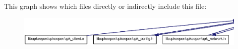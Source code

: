 This graph shows which files directly or indirectly include this file:\nopagebreak
\begin{figure}[H]
\begin{center}
\leavevmode
\includegraphics[width=400pt]{upk__include_8h__dep__incl}
\end{center}
\end{figure}
